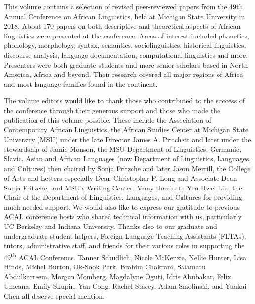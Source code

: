 \begin{refsection}
This volume contains a selection of revised peer-reviewed papers from the 49th Annual Conference on African Linguistics, held at Michigan State University in 2018. About 170 papers on both descriptive and theoretical aspects of African linguistics were presented at the conference. Areas of interest included phonetics, phonology, morphology, syntax, semantics, sociolinguistics, historical linguistics, discourse analysis, language documentation, computational linguistics and more. Presenters were both graduate students and more senior scholars based in North America, Africa and beyond. Their research covered all major regions of Africa and most language families found in the continent. 

The volume editors would like to thank those who contributed to the success of the conference through their generous support and those who made the publication of this volume possible. These include the Association of Contemporary African Linguistics, the African Studies Center at Michigan State University (MSU) under the late Director James A. Pritchett and later under the stewardship of Jamie Monson, the MSU Department of Linguistics, Germanic, Slavic, Asian and African Languages (now Department of Linguistics, Languages, and Cultures) then chaired by Sonja Fritzche and later Jason Merrill, the College of Arts and Letters especially Dean Christopher P. Long and Associate Dean Sonja Fritzche, and MSU’s Writing Center. Many thanks to Yen-Hwei Lin, the Chair of the Department of Linguistics, Languages, and Cultures for providing much-needed support. We would also like to express our gratitude to previous ACAL conference hosts who shared technical information with us, particularly UC Berkeley and Indiana University. Thanks also to our graduate and undergraduate student helpers, Foreign Language Teaching Assistants (FLTAs), tutors, administrative staff, and friends for their various roles in supporting the 49\textsuperscript{th} ACAL Conference. Tanner Schudlich, Nicole McKenzie, Nellie Hunter, Lisa Hinds, Michel Burton, Ok-Sook Park, Brahim Chakrani, Salamatu Abdulkarreem, Morgan Momberg, Magdalyne Oguti, Idris Abubakar, Felix Umeana, Emily Skupin, Yan Cong, Rachel Stacey, Adam Smolinski, and Yuakai Chen all deserve special mention.


\end{refsection}

